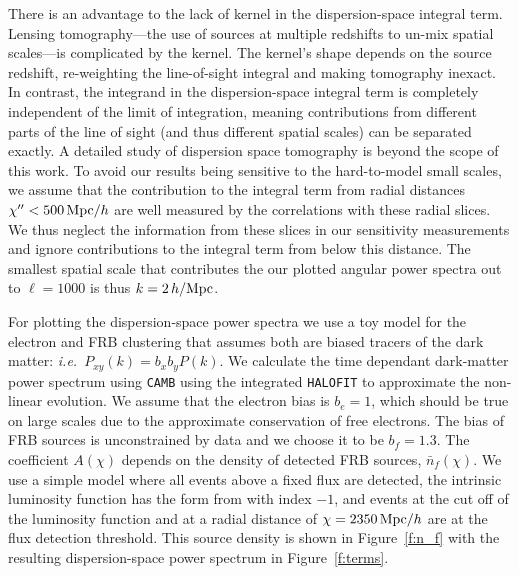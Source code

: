 \documentclass[twocolumn,prl,nofootinbib,floatfix]{revtex4-1}
\begin{document}
There is an advantage to the lack of kernel in the dispersion-space integral term.
Lensing tomography---the use of sources at multiple redshifts to un-mix
spatial scales---is complicated by the kernel. The kernel's shape depends on
the source redshift, re-weighting the line-of-sight integral and
making tomography inexact.  In contrast, the integrand in the dispersion-space integral
term is completely independent of the limit of integration, meaning
contributions from different parts of the line of sight (and thus different
spatial scales) can be separated exactly. A detailed study of dispersion space
tomography is beyond the scope of this work.  To avoid our results being
sensitive to the hard-to-model small scales, we assume that the contribution to the
integral term from radial distances $\chi'' < 500\,{\rm Mpc}/h$ are well
measured by the correlations with these radial slices. We thus neglect the
information from these slices in our sensitivity measurements and ignore
contributions to the integral term from below this distance. The smallest
spatial scale that contributes the our plotted angular power spectra out to
$\ell=1000$ is thus $k=2\,h/{\rm Mpc}$.

For plotting the dispersion-space power spectra we use a toy model for the electron and
FRB clustering that assumes both are biased tracers of the dark matter:
\emph{i.e.}~$P_{xy}(k)=b_x b_y P(k)$.  We
calculate the time dependant dark-matter power spectrum using {\tt CAMB} using
the integrated {\tt HALOFIT} to approximate the non-linear evolution. We assume
that the electron bias is $b_e=1$, which should be true on large scales due to
the approximate conservation of free electrons. The bias of FRB sources is
unconstrained by data and we choose it to be $b_f=1.3$. The coefficient
$A(\chi)$ depends on the density of detected FRB sources, $\bar n_f(\chi)$.
We use a simple model where all events above a fixed flux are detected,
the intrinsic luminosity function has the form from
\citet{1976ApJ...203..297S} with index $-1$, and events at the cut off of the
luminosity function and at
a radial distance of $\chi=2350\,{\rm Mpc}/h$ are at the flux detection threshold.
This source density is shown in Figure~\ref{f:n_f} with the resulting dispersion-space
power spectrum in Figure~\ref{f:terms}.
\end{document}
